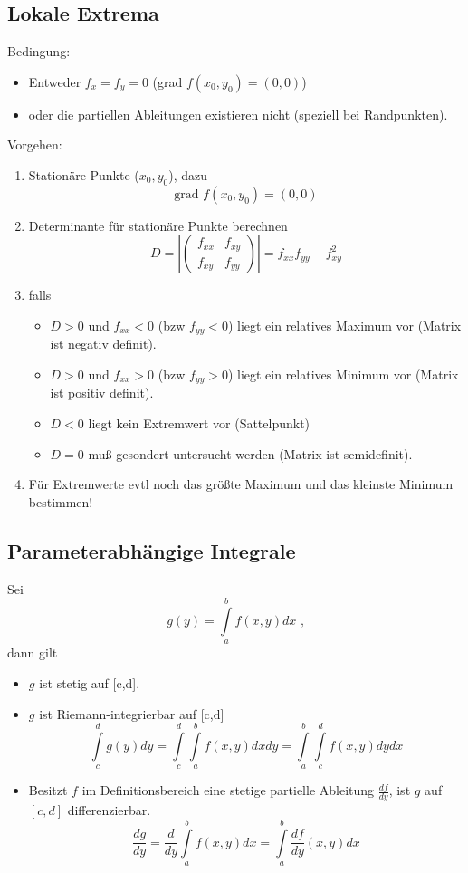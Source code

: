 \documentclass[12pt,a4paper]{article}
\begin{document}
\subsection{Lokale Extrema}
Bedingung:
\begin{itemize}
\item 
Entweder $f_x = f_y = 0$ (grad $f(x_0, y_0) = (0,0)$)
\item
oder die partiellen Ableitungen existieren nicht (speziell bei Randpunkten).
\end{itemize}
Vorgehen:
\begin{enumerate}
\item
Stationäre Punkte ($x_0, y_0$), dazu
\[\text{grad } f(x_0,y_0) = (0,0)\]

\item
Determinante für stationäre Punkte berechnen
\[D = \left| \begin{pmatrix} f_{xx} & f_{xy} \\
						f_{xy} & f_{yy} \end{pmatrix}\right|
						=f_{xx}f_{yy} - f^2_{xy}\]
\item

falls
\begin{itemize}
\item
$D>0$ und $f_{xx} < 0$ (bzw $f_{yy}<0$) liegt ein relatives Maximum vor (Matrix ist negativ definit).
\item
$D>0$ und $f_{xx} > 0$ (bzw $f_{yy}>0$) liegt ein relatives Minimum vor (Matrix ist positiv definit).
\item
$D<0$ liegt kein Extremwert vor (Sattelpunkt)
\item
$D=0$ muß gesondert untersucht werden (Matrix ist semidefinit).
\end{itemize}
\item
Für Extremwerte evtl noch das größte Maximum und das kleinste Minimum bestimmen!
\end{enumerate}

\subsection{Parameterabhängige Integrale}
Sei
\[ g(y) = \int\limits_a^b{f(x,y)dx}\text{ ,}\]
dann gilt
\begin{itemize}
\item
$g$ ist stetig auf [c,d].
\item
$g$ ist Riemann-integrierbar auf [c,d]
\[\int\limits_c^d{g(y)dy} = \int\limits_c^d{\int\limits_a^b{f(x,y)dx dy}}= \int\limits_a^b{\int\limits_c^d{f(x,y)dydx}} \]
\item
Besitzt $f$ im Definitionsbereich eine stetige partielle Ableitung $\frac{df}{dy}$, ist $g$ auf $[c,d]$ differenzierbar.
\[\frac{dg}{dy}=\frac{d}{dy}\int\limits_a^b{f(x,y)dx}= \int\limits_a^b{\frac{df}{dy}(x,y)dx}\]

\end{itemize}
\end{document}
